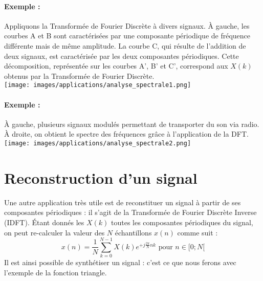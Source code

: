 \documentclass{report}
\begin{document}
		\paragraph{Exemple :} Appliquons la Transformée de Fourier Discrète à divers signaux. À gauche, les courbes A et B sont caractérisées par une composante périodique de fréquence différente mais de même amplitude. La courbe C, qui résulte de l'addition de deux signaux, est caractérisée par les deux composantes périodiques. Cette décomposition, représentée sur les courbes A', B' et C', correspond aux $X(k)$ obtenus par la Transformée de Fourier Discrète.\\

		\texttt{[image: images/applications/analyse\_spectrale1.png]}

		\paragraph{Exemple :} À gauche, plusieurs signaux modulés permettant de transporter du son via radio. À droite, on obtient le spectre des fréquences grâce à l'application de la DFT.\\

		\texttt{[image: images/applications/analyse\_spectrale2.png]}

	\section{Reconstruction d'un signal}
	Une autre application très utile est de reconstituer un signal à partir de ses composantes périodiques : il s'agit de la Transformée de Fourier Discrète Inverse (IDFT). Étant donnés les $X(k)$ toutes les composantes périodiques du signal, on peut re-calculer la valeur des $N$ échantillons $x(n)$ comme suit :
	\[
		x(n) = \frac{1}{N} \sum_{k=0}^{N-1} X(k) e^{+j\frac{2\pi}{N} nk} \text{ pour } n\in[0; N[
	\]
	Il est ainsi possible de synthétiser un signal : c'est ce que nous ferons avec l'exemple de la fonction triangle.


\end{document}
